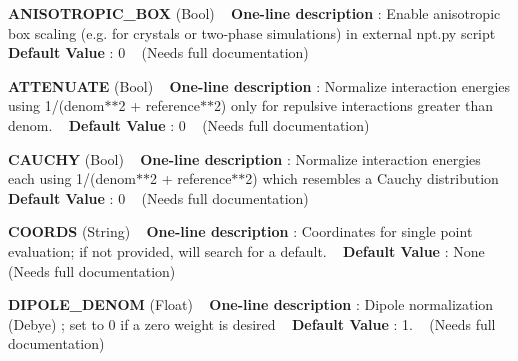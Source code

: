 \begin{DoxyItemize}
\item {\bfseries  A\+N\+I\+S\+O\+T\+R\+O\+P\+I\+C\+\_\+\+B\+OX } (Bool) ~\newline
{\bfseries  One-\/line description }\+: Enable anisotropic box scaling (e.\+g. for crystals or two-\/phase simulations) in external npt.\+py script ~\newline
{\bfseries  Default Value }\+: 0 ~\newline
(Needs full documentation)\end{DoxyItemize}
\begin{DoxyItemize}
\item {\bfseries  A\+T\+T\+E\+N\+U\+A\+TE } (Bool) ~\newline
{\bfseries  One-\/line description }\+: Normalize interaction energies using 1/(denom$\ast$$\ast$2 + reference$\ast$$\ast$2) only for repulsive interactions greater than denom. ~\newline
{\bfseries  Default Value }\+: 0 ~\newline
(Needs full documentation)\end{DoxyItemize}
\begin{DoxyItemize}
\item {\bfseries  C\+A\+U\+C\+HY } (Bool) ~\newline
{\bfseries  One-\/line description }\+: Normalize interaction energies each using 1/(denom$\ast$$\ast$2 + reference$\ast$$\ast$2) which resembles a Cauchy distribution ~\newline
{\bfseries  Default Value }\+: 0 ~\newline
(Needs full documentation)\end{DoxyItemize}
\begin{DoxyItemize}
\item {\bfseries  C\+O\+O\+R\+DS } (String) ~\newline
{\bfseries  One-\/line description }\+: Coordinates for single point evaluation; if not provided, will search for a default. ~\newline
{\bfseries  Default Value }\+: None ~\newline
(Needs full documentation)\end{DoxyItemize}
\begin{DoxyItemize}
\item {\bfseries  D\+I\+P\+O\+L\+E\+\_\+\+D\+E\+N\+OM } (Float) ~\newline
{\bfseries  One-\/line description }\+: Dipole normalization (Debye) ; set to 0 if a zero weight is desired ~\newline
{\bfseries  Default Value }\+: 1. ~\newline
(Needs full documentation)\end{DoxyItemize}
